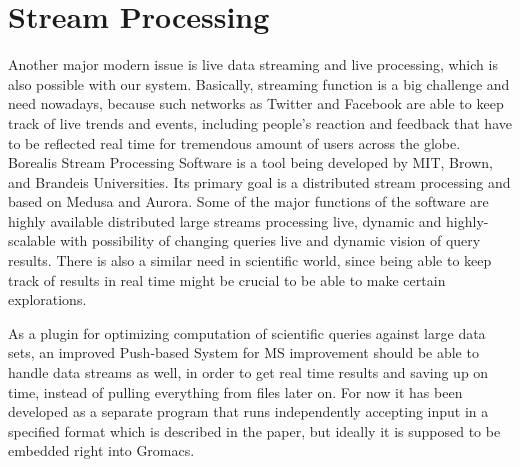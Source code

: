 \documentclass[12pt,letterpaper]{report}
\begin{document}
\section{Stream Processing}
\hspace{3em} Another major modern issue is live data streaming and live processing, which is also possible with our system. Basically, streaming function is a big challenge and need nowadays, because such networks as Twitter and Facebook are able to keep track of live trends and events, including people's reaction and feedback that have to be reflected real time for tremendous amount of users across the globe. Borealis Stream Processing Software is a tool being developed by MIT, Brown, and Brandeis Universities. Its primary goal is a distributed stream processing and based on Medusa and Aurora. Some of the major functions of the software are highly available distributed large streams processing live, dynamic and highly-scalable with possibility of changing queries live and dynamic vision of query results. \cite{borealis} There is also a similar need in scientific world, since being able to keep track of results in real time might be crucial to be able to make certain explorations. 

\noindent\hspace{3em}As a plugin for optimizing computation of scientific queries against large data sets, an improved Push-based System for MS improvement should be able to handle data streams as well, in order to get real time results and saving up on time, instead of pulling everything from files later on. For now it has been developed as a separate program that runs independently accepting input in a specified format which is described in the paper, but ideally it is supposed to be embedded right into Gromacs.
\end{document}
